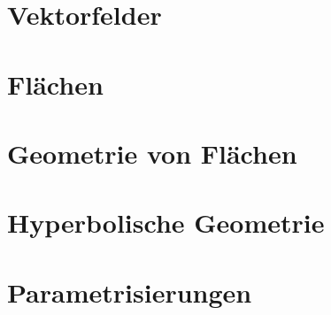 \documentclass[a4paper,11pt]{article} %
\theoremstyle{costum} %
\begin{document}
\section{Vektorfelder}

\vspace{3ex}
\section{Flächen}

\vspace{3ex}
\section{Geometrie von Flächen}

\section{Hyperbolische Geometrie}

\vspace{3ex}
\section{Parametrisierungen}

\vspace{3ex}
\end{document}
